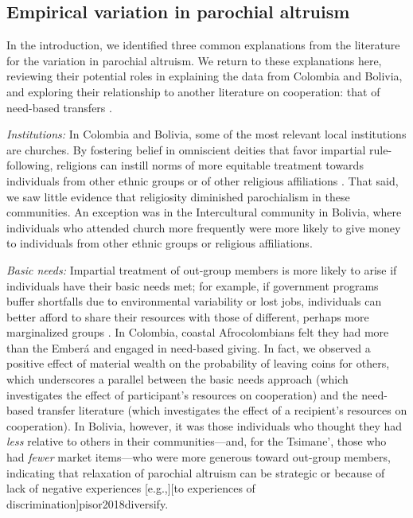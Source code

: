 \documentclass[bibauthoryear]{aa}
\begin{document}
\subsection{Empirical variation in parochial altruism}

In the introduction, we identified three common explanations from the literature for the variation in parochial altruism. We return to these explanations here, reviewing their potential roles in explaining the data from Colombia and Bolivia, and exploring their relationship to another literature on cooperation: that of need-based transfers \citep[e.g.,][]{peterson1993demand, hooper2015inclusive, aktipis2016cooperation, hao2015need, cronk2019managing}.

\emph{Institutions:} In Colombia and Bolivia, some of the most relevant local institutions are churches. By fostering belief in omniscient deities that favor impartial rule-following, religions can instill norms of more equitable treatment towards individuals from other ethnic groups or of other religious affiliations \citep{purzycki2018evolution, lang2019moralizing}. That said, we saw little evidence that religiosity diminished parochialism in these communities. An exception was in the Intercultural community in Bolivia, where individuals who attended church more frequently were more likely to give money to individuals from other ethnic groups or religious affiliations. 

\emph{Basic needs:} Impartial treatment of out-group members is more likely to arise if individuals have their basic needs met; for example, if government programs buffer shortfalls due to environmental variability or lost jobs, individuals can better afford to share their resources with those of different, perhaps more marginalized groups  \citep{hruschka2014impartial, silva2014cooperation}. In Colombia, coastal Afrocolombians felt they had more than the Ember\'a and  engaged in need-based giving. In fact, we observed a positive effect of material wealth on the probability of leaving coins for others, which underscores a parallel between the basic needs approach (which investigates the effect of participant's resources on cooperation) and the need-based transfer literature (which investigates the effect of a recipient's resources on cooperation). In Bolivia, however, it was those individuals who thought they had \emph{less} relative to others in their communities---and, for the Tsimane', those who had \emph{fewer} market items---who were more generous toward out-group members, indicating that relaxation of parochial altruism can be strategic \citep[e.g.,][building between-group relationships]{pisor2016risk} or because of lack of negative experiences [e.g.,][to experiences of discrimination]{pisor2018diversify}.
\end{document}
